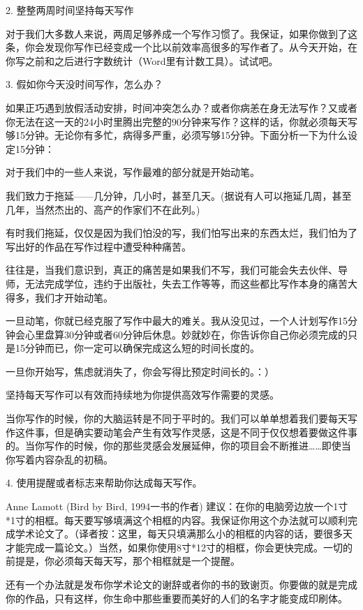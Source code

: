 \documentclass[12pt]{ctexart}
\begin{document}
2. 整整两周时间坚持每天写作

对于我们大多数人来说，两周足够养成一个写作习惯了。我保证，如果你做到了这条，你会发现你写作已经变成一个比以前效率高很多的写作者了。从今天开始，在你写之前和之后进行字数统计（Word里有计数工具）。试试吧。

3. 假如你今天没时间写作，怎么办？

如果正巧遇到放假活动安排，时间冲突怎么办？或者你病恙在身无法写作？又或者你无法在这一天的24小时里腾出完整的90分钟来写作？这样的话，你就必须每天写够15分钟。无论你有多忙，病得多严重，必须写够15分钟。下面分析一下为什么设定15分钟：

{\heiti 对于我们中的一些人来说，写作最难的部分就是开始动笔。}

我们致力于拖延——几分钟，几小时，甚至几天。(据说有人可以拖延几周，甚至几年，当然杰出的、高产的作家们不在此列。)

有时我们拖延，仅仅是因为我们怕没的写，我们怕写出来的东西太烂，我们怕为了写出好的作品在写作过程中遭受种种痛苦。

往往是，当我们意识到，真正的痛苦是如果我们不写，我们可能会失去伙伴、导师，无法完成学位，违约于出版社，失去工作等等，而这些都比写作本身的痛苦大得多，我们才开始动笔。

一旦动笔，你就已经克服了写作中最大的难关。我从没见过，一个人计划写作15分钟会心里盘算30分钟或者60分钟后休息。妙就妙在，你告诉你自己你必须完成的只是15分钟而已，你一定可以确保完成这么短的时间长度的。

一旦你开始写，焦虑就消失了，你会写得比预定时间长的。：）

{\heiti 坚持每天写作可以有效而持续地为你提供高效写作需要的灵感。}

当你写作的时候，你的大脑运转是不同于平时的。我们可以单单想着我们要每天写作这件事，但是确实要动笔会产生有效写作灵感，这是不同于仅仅想着要做这件事的。当你写作的时候，你的那些灵感会发展延伸，你的项目会不断推进……即使当你写着内容杂乱的初稿。

4. 使用提醒或者标志来帮助你达成每天写作。

Anne Lamott (Bird by Bird, 1994一书的作者) 建议：在你的电脑旁边放一个1寸*1寸的相框。每天要写够填满这个相框的内容。我保证你用这个办法就可以顺利完成学术论文了。（译者按：这里，每天只填满那么小的相框的内容的话，要很多天才能完成一篇论文。）当然，如果你使用8寸*12寸的相框，你会更快完成。一切的前提是，你必须每天每天写，那个相框就是一个提醒。

还有一个办法就是发布你学术论文的谢辞或者你的书的致谢页。你要做的就是完成你的作品，只有这样，你生命中那些重要而美好的人们的名字才能变成印刷体。
\end{document}
